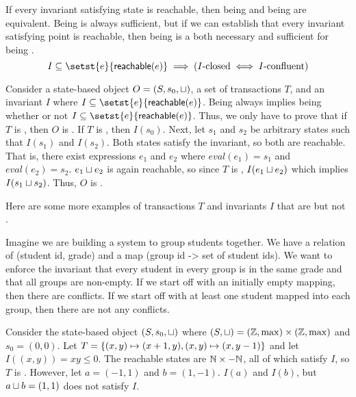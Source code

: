 \begin{claim}
  If every invariant satisfying state is reachable, then being \Iconfluent{}
  and being \Iclosed{} are equivalent. Being \Iclosed{} is always sufficient,
  but if we can establish that every invariant satisfying point is reachable,
  then being \Iclosed{} is a both necessary and sufficient for being
  \Iconfluent{}.
  \[
    I \subseteq \setst{e}{\reachable{e}} \implies
    (\text{\Iclosed{}} \iff \text{\Iconfluent})
  \]
\end{claim}
\begin{elidableproof}
  Consider a state-based object $O = (S, s_0, \sqcup)$, a set of transactions
  $T$, and an invariant $I$ where $I \subseteq \setst{e}{\reachable{e}}$.
  Being \Iclosed{} always implies being \Iconfluent{} whether or not $I
  \subseteq \setst{e}{\reachable{e}}$. Thus, we only have to prove that if $T$
  is \Iconfluent{}, then $O$ is \Iclosed. If $T$ is \Iconfluent{}, then
  $I(s_0)$. Next, let $s_1$ and $s_2$ be arbitrary states such that $I(s_1)$
  and $I(s_2)$. Both states satisfy the invariant, so both are reachable. That
  is, there exist expressions $e_1$ and $e_2$ where $eval(e_1) = s_1$  and
  $eval(e_2) = s_2$. $e_1 \sqcup e_2$ is again reachable, so since $T$ is
  \Iconfluent{}, $I(e_1 \sqcup e_2)$ which implies $I(s_1 \sqcup s_2)$. Thus, $O$
  is \Iclosed.
\end{elidableproof}

Here are some more examples of transactions $T$ and invariants $I$ that are
\Iconfluent{} but not \Iclosed{}. 

\begin{example}
  Imagine we are building a system to group students together. We have a relation
  of (student id, grade) and a map (group id -> set of student ids). We want to
  enforce the invariant that every student in every group is in the same grade
  and that all groups are non-empty. If we start off with an initially empty
  mapping, then there are conflicts. If we start off with at least one student
  mapped into each group, then there are not any conflicts.
\end{example}

\begin{example}
  Consider the state-based object $(S, s_0, \sqcup)$ where $(S, \sqcup) = (\mathbb{Z},
  \max) \times (\mathbb{Z}, \max)$ and $s_0 = (0, 0)$. Let $T = \{(x, y) \mapsto
  (x + 1, y), (x, y) \mapsto (x, y - 1)\}$ and let $I((x, y)) = xy \leq 0$. The
  reachable states are $\mathbb{N} \times -\mathbb{N}$, all of which satisfy $I$, so $T$
  is \Iconfluent{}. However, let $a = (-1, 1)$ and $b = (1, -1)$. $I(a)$ and
  $I(b)$, but $a \sqcup b = (1, 1)$ does not satisfy $I$.
\end{example}

